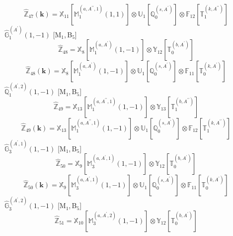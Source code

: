 \documentclass[fleqn,10pt,landscape]{article}
\begin{document}
\begin{itemize}
\begin{dmath*}
\hat{\mathbb{Z}}_{47}(\bm{k})=\mathbb{X}_{11}[\mathbb{M}_{1}^{(a,A^{\prime\prime},1)}(1,1)] \otimes\mathbb{U}_{1}[\mathbb{Q}_{0}^{(s,A^{\prime})}] \otimes\mathbb{F}_{12}[\mathbb{T}_{1}^{(k,A^{\prime\prime})}]
\end{dmath*}
\vspace{4mm}
\noindent {} $\,\,\,\hat{\mathbb{G}}_{1}^{(A^{\prime})}(1,-1)$ [M$_{1}$,\,B$_{5}$]
\begin{dmath*}
\hat{\mathbb{Z}}_{48}=\mathbb{X}_{8}[\mathbb{M}_{1}^{(a,A^{\prime})}(1,-1)] \otimes\mathbb{Y}_{12}[\mathbb{T}_{0}^{(b,A^{\prime})}]
\end{dmath*}
\begin{dmath*}
\hat{\mathbb{Z}}_{48}(\bm{k})=\mathbb{X}_{8}[\mathbb{M}_{1}^{(a,A^{\prime})}(1,-1)] \otimes\mathbb{U}_{1}[\mathbb{Q}_{0}^{(s,A^{\prime})}] \otimes\mathbb{F}_{11}[\mathbb{T}_{0}^{(k,A^{\prime})}]
\end{dmath*}
\vspace{4mm}
\noindent {} $\,\,\,\hat{\mathbb{Q}}_{1}^{(A^{\prime},2)}(1,-1)$ [M$_{1}$,\,B$_{5}$]
\begin{dmath*}
\hat{\mathbb{Z}}_{49}=\mathbb{X}_{13}[\mathbb{M}_{1}^{(a,A^{\prime\prime},1)}(1,-1)] \otimes\mathbb{Y}_{13}[\mathbb{T}_{1}^{(b,A^{\prime\prime})}]
\end{dmath*}
\begin{dmath*}
\hat{\mathbb{Z}}_{49}(\bm{k})=\mathbb{X}_{13}[\mathbb{M}_{1}^{(a,A^{\prime\prime},1)}(1,-1)] \otimes\mathbb{U}_{1}[\mathbb{Q}_{0}^{(s,A^{\prime})}] \otimes\mathbb{F}_{12}[\mathbb{T}_{1}^{(k,A^{\prime\prime})}]
\end{dmath*}
\vspace{4mm}
\noindent {} $\,\,\,\hat{\mathbb{G}}_{3}^{(A^{\prime},1)}(1,-1)$ [M$_{1}$,\,B$_{5}$]
\begin{dmath*}
\hat{\mathbb{Z}}_{50}=\mathbb{X}_{9}[\mathbb{M}_{3}^{(a,A^{\prime},1)}(1,-1)] \otimes\mathbb{Y}_{12}[\mathbb{T}_{0}^{(b,A^{\prime})}]
\end{dmath*}
\begin{dmath*}
\hat{\mathbb{Z}}_{50}(\bm{k})=\mathbb{X}_{9}[\mathbb{M}_{3}^{(a,A^{\prime},1)}(1,-1)] \otimes\mathbb{U}_{1}[\mathbb{Q}_{0}^{(s,A^{\prime})}] \otimes\mathbb{F}_{11}[\mathbb{T}_{0}^{(k,A^{\prime})}]
\end{dmath*}
\vspace{4mm}
\noindent {} $\,\,\,\hat{\mathbb{G}}_{3}^{(A^{\prime},2)}(1,-1)$ [M$_{1}$,\,B$_{5}$]
\begin{dmath*}
\hat{\mathbb{Z}}_{51}=\mathbb{X}_{10}[\mathbb{M}_{3}^{(a,A^{\prime},2)}(1,-1)] \otimes\mathbb{Y}_{12}[\mathbb{T}_{0}^{(b,A^{\prime})}]

\end{dmath*}
\end{itemize}
\end{document}
